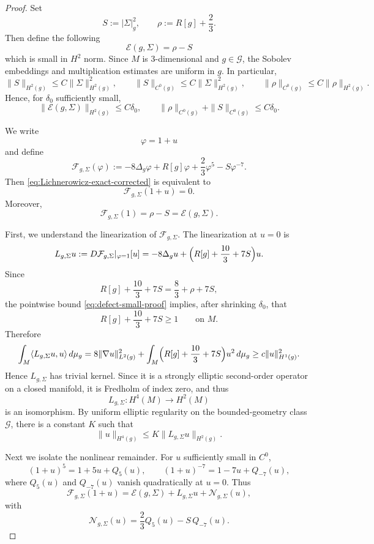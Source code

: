 \documentclass[10pt,a4paper]{amsart}
\begin{document}
\begin{proof}
Set
\[
S:=|\Sigma|_{g}^{2},
\qquad
\rho:=R[g]+\frac23.
\]
Then define the following
\[
\mathcal E(g,\Sigma)=\rho-S
\]
which is small in $H^{2}$ norm. 
Since \(M\) is \(3\)-dimensional and \(g\in\mathcal G\), the Sobolev embeddings and
multiplication estimates are uniform in \(g\). In particular,
\[
\|S\|_{H^{2}(g)}\le C\|\Sigma\|_{H^{2}(g)}^{2},
\qquad
\|S\|_{C^{0}(g)}\le C\|\Sigma\|_{H^{2}(g)}^{2},
\qquad
\|\rho\|_{C^{0}(g)}\le C\|\rho\|_{H^{2}(g)}.
\]
Hence, for \(\delta_{0}\) sufficiently small,
\begin{equation}
\label{eq:defect-small-proof}
\|\mathcal E(g,\Sigma)\|_{H^{2}(g)}
\le C\delta_{0},
\qquad
\|\rho\|_{C^{0}(g)}+\|S\|_{C^{0}(g)}\le C\delta_{0}.
\end{equation}

\noindent We write
\[
\varphi=1+u
\]
and define
\[
\mathcal F_{g,\Sigma}(\varphi)
:=
-8\Delta_{g}\varphi + R[g]\varphi + \frac23\varphi^{5}-S\varphi^{-7}.
\]
Then \eqref{eq:Lichnerowicz-exact-corrected} is equivalent to
\[
\mathcal F_{g,\Sigma}(1+u)=0.
\]
Moreover,
\[
\mathcal F_{g,\Sigma}(1)=\rho-S=\mathcal E(g,\Sigma).
\]

\noindent First, we understand the linearization of $\mathcal F_{g,\Sigma}$. The linearization at \(u=0\) is
\[
L_{g,\Sigma}u
:=
D\mathcal F_{g,\Sigma}|_{\varphi=1}[u]
=
-8\Delta_{g}u+\Bigl(R[g]+\frac{10}{3}+7S\Bigr)u.
\]
Since
\[
R[g]+\frac{10}{3}+7S
=
\frac83+\rho+7S,
\]
the pointwise bound \eqref{eq:defect-small-proof} implies, after shrinking \(\delta_{0}\),
that
\[
R[g]+\frac{10}{3}+7S\ge 1
\qquad\text{on }M.
\]
Therefore
\[
\int_{M} \langle L_{g,\Sigma}u,u\rangle\,d\mu_{g}
=
8\|\nabla u\|_{L^{2}(g)}^{2}
+
\int_{M}\Bigl(R[g]+\frac{10}{3}+7S\Bigr)u^{2}\,d\mu_{g}
\ge c\|u\|_{H^{1}(g)}^{2}.
\]
Hence \(L_{g,\Sigma}\) has trivial kernel. Since it is a strongly elliptic second-order
operator on a closed manifold, it is Fredholm of index zero, and thus
\[
L_{g,\Sigma}\colon H^{4}(M)\to H^{2}(M)
\]
is an isomorphism. By uniform elliptic regularity on the bounded-geometry class
\(\mathcal G\), there is a constant \(K\) such that
\begin{equation}
\label{eq:elliptic-L-corrected}
\|u\|_{H^{4}(g)}
\le
K\|L_{g,\Sigma}u\|_{H^{2}(g)}.
\end{equation}

\noindent Next we isolate the nonlinear remainder. For \(u\) sufficiently small in \(C^{0}\),
\[
(1+u)^{5}=1+5u+Q_{5}(u),
\qquad
(1+u)^{-7}=1-7u+Q_{-7}(u),
\]
where \(Q_{5}(u)\) and \(Q_{-7}(u)\) vanish quadratically at \(u=0\). Thus
\[
\mathcal F_{g,\Sigma}(1+u)
=
\mathcal E(g,\Sigma)+L_{g,\Sigma}u+\mathcal N_{g,\Sigma}(u),
\]
with
\[
\mathcal N_{g,\Sigma}(u)
=
\frac23 Q_{5}(u)-S\,Q_{-7}(u).
\]


\end{proof}
\end{document}
